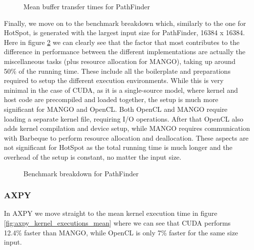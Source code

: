 \begin{figure}%
    \centering
    \qquad
    \captionsetup{justification=centering}
    \caption{Mean buffer transfer times for PathFinder}%
    \label{fig:pathfinder_buffer_transfers_mean}%
\end{figure}

Finally, we move on to the benchmark breakdown which, similarly to the one for HotSpot, is generated with the largest input size for PathFinder, 16384 x 16384. Here in figure \ref{fig:pathfinder_breakdown} we can clearly see that the factor that most contributes to the difference in performance between the different implementations are actually the miscellaneous tasks (plus resource allocation for MANGO), taking up around 50\% of the running time. These include all the boilerplate and preparations required to setup the different execution environments. While this is very minimal in the case of CUDA, as it is a single-source model, where kernel and host code are precompiled and loaded together, the setup is much more significant for MANGO and OpenCL. Both OpenCL and MANGO require loading a separate kernel file, requiring I/O operations. After that OpenCL also adds kernel compilation and device setup, while MANGO requires communication with Barbeque to perform resource allocation and deallocation. These aspects are not significant for HotSpot as the total running time is much longer and the overhead of the setup is constant, no matter the input size.

\begin{figure}
    \centering
    \resizebox{!}{160pt}{
        
    }
    \captionsetup{justification=centering}
    \caption{Benchmark breakdown for PathFinder}
    \label{fig:pathfinder_breakdown}
\end{figure}

\subsubsection{AXPY}

In AXPY we move straight to the mean kernel execution time in figure \ref{fig:axpy_kernel_executions_mean} where we can see that CUDA performs 12.4\% faster than MANGO, while OpenCL is only 7\% faster for the same size input.

